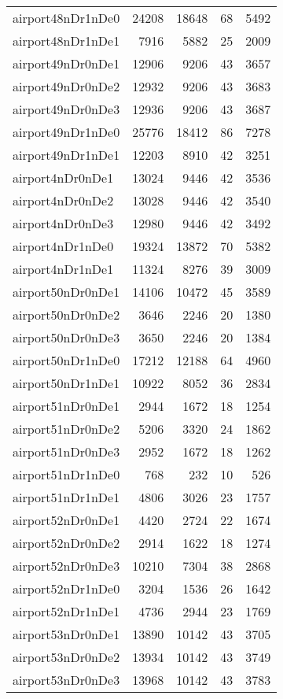\begin{tabular}{lrrrr}
airport48nDr1nDe0 & 24208 & 18648 & 68 & 5492 \\
airport48nDr1nDe1 & 7916 & 5882 & 25 & 2009 \\
airport49nDr0nDe1 & 12906 & 9206 & 43 & 3657 \\
airport49nDr0nDe2 & 12932 & 9206 & 43 & 3683 \\
airport49nDr0nDe3 & 12936 & 9206 & 43 & 3687 \\
airport49nDr1nDe0 & 25776 & 18412 & 86 & 7278 \\
airport49nDr1nDe1 & 12203 & 8910 & 42 & 3251 \\
airport4nDr0nDe1 & 13024 & 9446 & 42 & 3536 \\
airport4nDr0nDe2 & 13028 & 9446 & 42 & 3540 \\
airport4nDr0nDe3 & 12980 & 9446 & 42 & 3492 \\
airport4nDr1nDe0 & 19324 & 13872 & 70 & 5382 \\
airport4nDr1nDe1 & 11324 & 8276 & 39 & 3009 \\
airport50nDr0nDe1 & 14106 & 10472 & 45 & 3589 \\
airport50nDr0nDe2 & 3646 & 2246 & 20 & 1380 \\
airport50nDr0nDe3 & 3650 & 2246 & 20 & 1384 \\
airport50nDr1nDe0 & 17212 & 12188 & 64 & 4960 \\
airport50nDr1nDe1 & 10922 & 8052 & 36 & 2834 \\
airport51nDr0nDe1 & 2944 & 1672 & 18 & 1254 \\
airport51nDr0nDe2 & 5206 & 3320 & 24 & 1862 \\
airport51nDr0nDe3 & 2952 & 1672 & 18 & 1262 \\
airport51nDr1nDe0 & 768 & 232 & 10 & 526 \\
airport51nDr1nDe1 & 4806 & 3026 & 23 & 1757 \\
airport52nDr0nDe1 & 4420 & 2724 & 22 & 1674 \\
airport52nDr0nDe2 & 2914 & 1622 & 18 & 1274 \\
airport52nDr0nDe3 & 10210 & 7304 & 38 & 2868 \\
airport52nDr1nDe0 & 3204 & 1536 & 26 & 1642 \\
airport52nDr1nDe1 & 4736 & 2944 & 23 & 1769 \\
airport53nDr0nDe1 & 13890 & 10142 & 43 & 3705 \\
airport53nDr0nDe2 & 13934 & 10142 & 43 & 3749 \\
airport53nDr0nDe3 & 13968 & 10142 & 43 & 3783 \\

\end{tabular}
